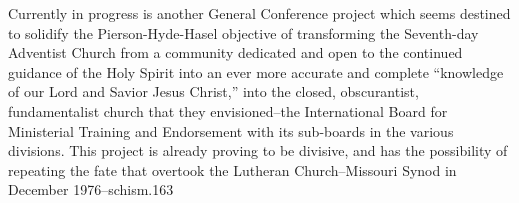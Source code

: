Currently in progress is another General Conference project which seems
destined to solidify the Pierson-Hyde-Hasel objective of transforming the
Seventh-day Adventist Church from a community dedicated and open to the
continued guidance of the Holy Spirit into an ever more accurate and
complete ``knowledge of our Lord and Savior Jesus Christ,'' into the
closed, obscurantist, fundamentalist church that they envisioned--the
International Board for Ministerial Training and Endorsement with its
sub-boards in the various divisions. This project is already proving to be
divisive, and has the possibility of repeating the fate that overtook the
Lutheran Church--Missouri Synod in December 1976--schism.163
